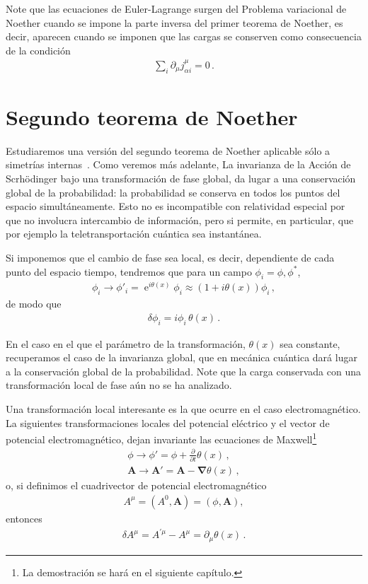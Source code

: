 Note que las ecuaciones de Euler-Lagrange surgen del Problema variacional de Noether cuando se impone la parte inversa del primer teorema de Noether, es decir, aparecen cuando se imponen que las cargas se conserven como consecuencia de la condición
\begin{align}
   \sum_i \partial_{\mu} j^{\mu}_{\alpha i}=0\,.
\end{align}
\section{Segundo teorema de Noether}

Estudiaremos  una versión del segundo teorema de Noether aplicable sólo a simetrías internas~\cite{La version general del teorema incluye el caso de la relatividad general}. Como veremos más adelante, La invarianza de la Acción de Scrhödinger bajo una transformación de fase global, da lugar a una conservación global de la probabilidad: la probabilidad se conserva en todos los puntos del espacio simultáneamente. Esto no es incompatible con relatividad especial por que no involucra intercambio de información, pero si permite, en particular, que por ejemplo la teletransportación cuántica sea instantánea.

Si imponemos que el cambio de fase sea local, es decir, dependiente de cada punto  del espacio tiempo, tendremos que para un campo $\phi_{i}=\phi,\phi^{*}$,
\begin{align}
  \phi_i\to \phi'_i=\operatorname{e}^{i \theta(x)}\phi_i\approx (1+i\theta(x))\phi_i \,,
\end{align}
de modo que
\begin{align}
  \delta\phi_i=i  \phi_i\,\theta(x)\,.
\end{align}

En el caso en el que el parámetro de la transformación, $\theta(x)$ sea constante, recuperamos el caso de la invarianza global, que en mecánica cuántica dará lugar a la conservación global de la probabilidad. Note que la carga conservada con una transformación local de fase aún no se ha analizado.

Una transformación local interesante es la que ocurre en el caso electromagnético. La siguientes transformaciones locales del potencial eléctrico y el vector de potencial electromagnético, dejan invariante las ecuaciones de Maxwell\footnote{La demostración se hará en el siguiente capítulo.}
\begin{align}
  \phi \to \phi'=\phi+\frac{\partial}{\partial t}\theta(x)\,,\nonumber\\
  \mathbf{A} \to \mathbf{A}'=\mathbf{A}- \boldsymbol{\nabla}\theta(x)\,,
\end{align}
o, si definimos el cuadrivector de potencial electromagnético
\begin{align}
  A^{\mu}=(A^0,\mathbf{A})=(\phi,\mathbf{A}),
\end{align}
entonces %
\begin{align}
  \delta A^{\mu}=A^{\prime\mu}-A^{\mu}=\partial_\mu \theta(x)\,.
\end{align}


